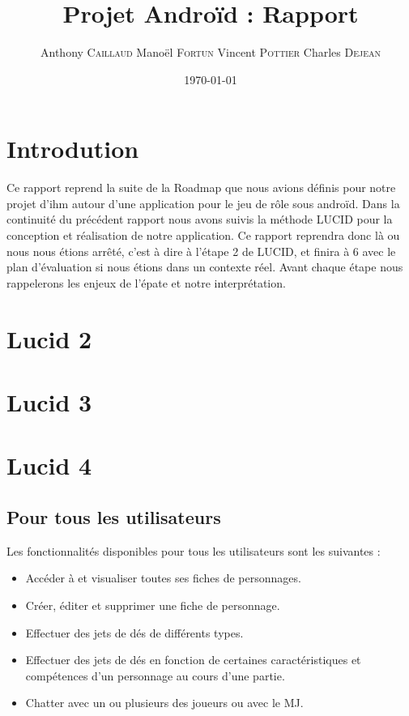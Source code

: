 \documentclass[11pt,a4paper]{report}
\title{Projet Androïd : Rapport}
\author{Anthony \textsc{Caillaud} Manoël \textsc{Fortun} Vincent
\textsc{Pottier} Charles \textsc{Dejean}}
\date{\today}
\begin{document}
\maketitle

\clearpage
\tableofcontents
\clearpage
\section{Introdution}

Ce rapport reprend la suite de la Roadmap que nous avions définis pour notre
projet d'ihm autour d'une application pour le jeu de rôle sous androïd.
Dans la continuité du précédent rapport nous avons suivis la méthode LUCID pour
la conception et réalisation de notre application. Ce rapport reprendra donc là
ou nous nous étions arrêté, c'est à dire à l'étape 2 de LUCID, et finira à 6
avec le plan d'évaluation si nous étions dans un contexte réel.
Avant chaque étape nous rappelerons les enjeux de l'épate et notre
interprétation.

\clearpage

\section{Lucid 2}
\label{utilisateurs}



\section{Lucid 3}

\section{Lucid 4}

\subsection{Pour tous les utilisateurs}
Les fonctionnalités disponibles pour tous les utilisateurs sont les suivantes :

\begin{itemize}
  \item Accéder à et visualiser toutes ses fiches de personnages.
  \item Créer, éditer et supprimer une fiche de personnage.
  \item Effectuer des jets de dés de différents types.
  \item Effectuer des jets de dés en fonction de certaines caractéristiques et
  compétences d'un personnage au cours d'une partie.
  \item Chatter avec un ou plusieurs des joueurs ou avec le MJ.
\end{itemize}
\end{document}
